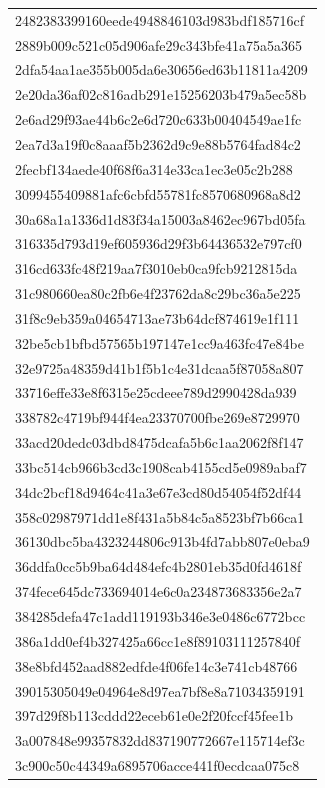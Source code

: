 \begin{tabular}{l}
2482383399160eede4948846103d983bdf185716cf \\
2889b009c521c05d906afe29c343bfe41a75a5a365 \\
2dfa54aa1ae355b005da6e30656ed63b11811a4209 \\
2e20da36af02c816adb291e15256203b479a5ec58b \\
2e6ad29f93ae44b6c2e6d720c633b00404549ae1fc \\
2ea7d3a19f0c8aaaf5b2362d9c9e88b5764fad84c2 \\
2fecbf134aede40f68f6a314e33ca1ec3e05c2b288 \\
3099455409881afc6cbfd55781fc8570680968a8d2 \\
30a68a1a1336d1d83f34a15003a8462ec967bd05fa \\
316335d793d19ef605936d29f3b64436532e797cf0 \\
316cd633fc48f219aa7f3010eb0ca9fcb9212815da \\
31c980660ea80c2fb6e4f23762da8c29bc36a5e225 \\
31f8c9eb359a04654713ae73b64dcf874619e1f111 \\
32be5cb1bfbd57565b197147e1cc9a463fc47e84be \\
32e9725a48359d41b1f5b1c4e31dcaa5f87058a807 \\
33716effe33e8f6315e25cdeee789d2990428da939 \\
338782c4719bf944f4ea23370700fbe269e8729970 \\
33acd20dedc03dbd8475dcafa5b6c1aa2062f8f147 \\
33bc514cb966b3cd3c1908cab4155cd5e0989abaf7 \\
34dc2bcf18d9464c41a3e67e3cd80d54054f52df44 \\
358c02987971dd1e8f431a5b84c5a8523bf7b66ca1 \\
36130dbc5ba4323244806c913b4fd7abb807e0eba9 \\
36ddfa0cc5b9ba64d484efc4b2801eb35d0fd4618f \\
374fece645dc733694014e6c0a234873683356e2a7 \\
384285defa47c1add119193b346e3e0486c6772bcc \\
386a1dd0ef4b327425a66cc1e8f89103111257840f \\
38e8bfd452aad882edfde4f06fe14c3e741cb48766 \\
39015305049e04964e8d97ea7bf8e8a71034359191 \\
397d29f8b113cddd22eceb61e0e2f20fccf45fee1b \\
3a007848e99357832dd837190772667e115714ef3c \\
3c900c50c44349a6895706acce441f0ecdcaa075c8 \\

\end{tabular}
